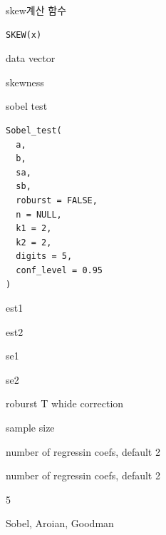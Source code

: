 \documentclass[a4paper]{book}
\begin{document}
%
\begin{Description}
skew계산 함수
\end{Description}
%
\begin{Usage}
\begin{verbatim}
SKEW(x)
\end{verbatim}
\end{Usage}
%
\begin{Arguments}
\begin{ldescription}
\item[\code{x}] data  vector
\end{ldescription}
\end{Arguments}
%
\begin{Value}
skewness
\end{Value}

%
\begin{Description}
sobel test
\end{Description}
%
\begin{Usage}
\begin{verbatim}
Sobel_test(
  a,
  b,
  sa,
  sb,
  roburst = FALSE,
  n = NULL,
  k1 = 2,
  k2 = 2,
  digits = 5,
  conf_level = 0.95
)
\end{verbatim}
\end{Usage}
%
\begin{Arguments}
\begin{ldescription}
\item[\code{a}] est1

\item[\code{b}] est2

\item[\code{sa}] se1

\item[\code{sb}] se2

\item[\code{roburst}] roburst T whide correction

\item[\code{n}] sample size

\item[\code{k1}] number of regressin coefs, default 2

\item[\code{k2}] number of regressin coefs, default 2

\item[\code{digits}] 5

\item[\code{type}] Sobel, Aroian, Goodman
\end{ldescription}
\end{Arguments}
\end{document}
